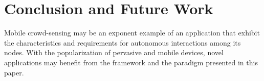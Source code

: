 \section{Conclusion and Future Work}\label{sec:conclusion}

Mobile crowd-sensing may be an exponent example of an application that exhibit the characteristics and requirements for autonomous interactions among its nodes. With the popularization of pervasive and mobile devices, novel applications may benefit from the framework and the paradigm presented in this paper.